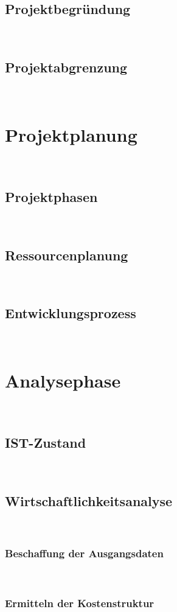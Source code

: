 \documentclass[12pt,toc=sectionentrywithoutdots, headheight=44pt, headings=optiontoheadandtoc]{scrartcl}
\begin{document}
\subsection{Projektbegründung}
\blindtext\

\subsection{Projektabgrenzung}
\blindtext\

\section{Projektplanung}
\blindtext\

\subsection{Projektphasen}
\blindtext\

\subsection{Ressourcenplanung}
\blindtext\

\subsection{Entwicklungsprozess}
\blindtext\

\section{Analysephase}
\blindtext\

\subsection{IST-Zustand}
\blindtext\

\subsection{Wirtschaftlichkeitsanalyse}
\blindtext\

\subsubsection{Beschaffung der Ausgangsdaten}
\blindtext\

\subsubsection{Ermitteln der Kostenstruktur}
\blindtext\
\end{document}
